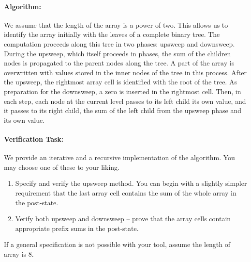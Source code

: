 \documentclass[sttt,final]{svjour}
\begin{document}
\paragraph{Algorithm:}
We assume that the length of the array is a power of two. This allows
us to identify the array initially with the leaves of a complete
binary tree. The computation proceeds along this tree in two phases:
upsweep and downsweep. During the upsweep, which itself proceeds in
phases, the sum of the children nodes is propagated to the parent
nodes along the tree. A part of the array is overwritten with values
stored in the inner nodes of the tree in this process. After the
upsweep, the rightmost array cell is identified with the root of the
tree. As preparation for the downsweep, a zero is inserted in the
rightmost cell.  Then, in each step, each node at the current level
passes to its left child its own value, and it passes to its right
child, the sum of the left child from the upsweep phase and its own
value.
%
\paragraph{Verification Task:}
We provide an iterative and a recursive implementation of the algorithm. You
may choose one of these to your liking.
\begin{enumerate}
\item Specify and verify the upsweep method. You can begin with a
  slightly simpler requirement that the last array cell contains the
  sum of the whole array in the post-state.
\item Verify both upsweep and downsweep -- prove that the array cells
  contain appropriate prefix sums in the post-state.
\end{enumerate}
If a general specification is not possible with your tool, assume the
length of array is 8.
\end{document}
